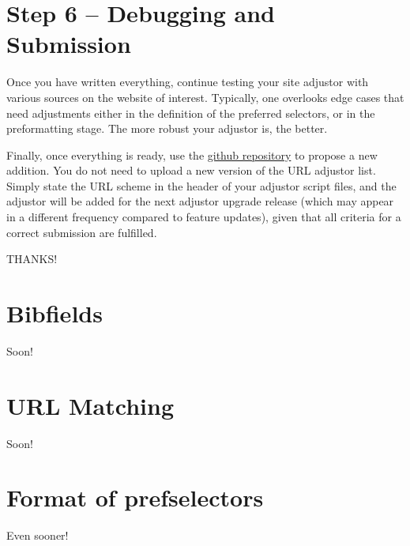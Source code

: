 \documentclass[
a4paper,
12pt,
]
{article}
\begin{document}
\section{Step 6 -- Debugging and Submission}\label{sec_6}

Once you have written everything, continue testing your site adjustor with various sources on the website of interest. Typically, one overlooks edge cases that need adjustments either in the definition of the preferred selectors, or in the preformatting stage. The more robust your adjustor is, the better.\par

Finally, once everything is ready, use the \href{https://github.com/Langenscheiss/bibitnow}{github repository} to propose a new addition. You do not need to upload a new version of the URL adjustor list. Simply state the URL scheme in the header of your adjustor script files, and the adjustor will be added for the next adjustor upgrade release (which may appear in a different frequency compared to feature updates), given that all criteria for a correct submission are fulfilled.

THANKS!

\appendix
 \section{Bibfields}\label{app_bibfields}
 
 Soon!
 
 \section{URL Matching}\label{app_matching}
 
 Soon!
 
 \section{Format of prefselectors}\label{app_prefselector}

 Even sooner!
 
\end{document}
